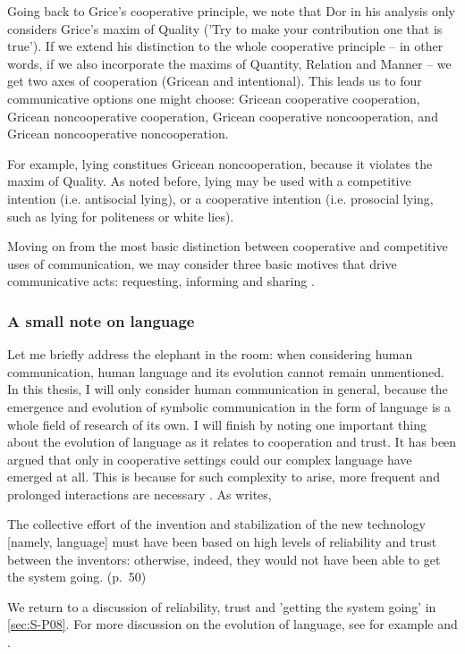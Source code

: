 Going back to Grice's cooperative principle, we note that Dor in his analysis only considers Grice's maxim of Quality ('Try to make your contribution one that is true'). If we extend his distinction to the whole cooperative principle -- in other words, if we also incorporate the maxims of Quantity, Relation and Manner -- we get two axes of cooperation (Gricean and intentional). This leads us to four communicative options one might choose: Gricean cooperative cooperation, Gricean noncooperative cooperation, Gricean cooperative noncooperation, and Gricean noncooperative noncooperation.

For example, lying constitues Gricean noncooperation, because it violates the maxim of Quality. As noted before, lying may be used with a competitive intention (i.e. antisocial lying), or a cooperative intention (i.e. prosocial lying, such as lying for politeness or white lies).

Moving on from the most basic distinction between cooperative and competitive uses of communication, we may consider three basic motives that drive communicative acts:
requesting, informing and sharing \citep{Tomasello08}.

\subsubsection{A small note on language}
\label{sec:comm:language}


Let me briefly address the elephant in the room: when considering human communication, human language and its evolution cannot remain unmentioned. In this thesis, I will only consider human communication in general, because the emergence and evolution of symbolic communication in the form of language is a whole field of research of its own.
I will finish by noting one important thing about the evolution of language as it relates to cooperation and trust. It has been argued that only in cooperative settings could our complex language have emerged at all. This is because for such complexity to arise, more frequent and prolonged interactions are necessary \citep{Benitez21}. As \citet{Dor17} writes,
\begin{quoting}
    The collective effort of the invention and stabilization of the new technology [namely, language] must have been based on high levels of reliability and trust between the inventors: otherwise, indeed, they would not have been able to get the system going.
    \hfill (p.~50)
\end{quoting}
We return to a discussion of reliability, trust and 'getting the system going' in \cref{sec:S-P08}. For more discussion on the evolution of language, see for example \citet{Tomasello08} and \citet{Dor17}.

